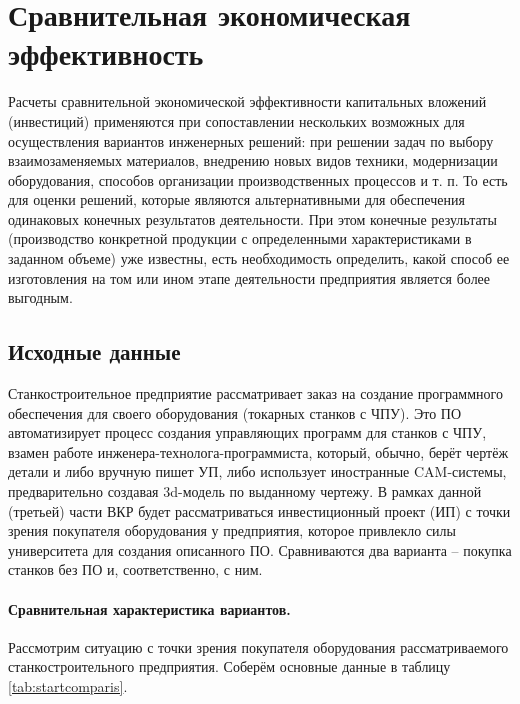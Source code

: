 \section{Сравнительная экономическая эффективность}

Расчеты сравнительной экономической эффективности капитальных вложений (инвестиций) применяются при сопоставлении нескольких возможных для осуществления вариантов инженерных решений: при решении задач по выбору взаимозаменяемых материалов, внедрению новых видов техники, модернизации оборудования, способов организации производственных процессов и т. п. То есть для оценки решений, которые являются альтернативными для обеспечения одинаковых конечных результатов деятельности. При этом конечные результаты (производство конкретной продукции с определенными характеристиками в заданном объеме) уже известны, есть необходимость определить, какой способ ее изготовления на том или ином этапе деятельности предприятия является более выгодным.

\subsection{Исходные данные}

Станкостроительное предприятие рассматривает заказ на создание программного обеспечения для своего оборудования (токарных станков с ЧПУ). Это ПО автоматизирует процесс создания управляющих программ для станков с ЧПУ, взамен работе инженера-технолога-программиста, который, обычно, берёт чертёж детали и либо вручную пишет УП, либо использует иностранные CAM-системы, предварительно создавая 3d-модель по выданному чертежу.
В рамках данной (третьей) части ВКР будет рассматриваться инвестиционный проект (ИП) с точки зрения покупателя оборудования у предприятия, которое привлекло силы университета для создания описанного ПО. Сравниваются два варианта – покупка станков без ПО и, соответственно, с ним.

\paragraph{Сравнительная характеристика вариантов.} Рассмотрим ситуацию с точки зрения покупателя оборудования рассматриваемого станкостроительного предприятия. Соберём основные данные в таблицу  \ref{tab:startcomparis}.

